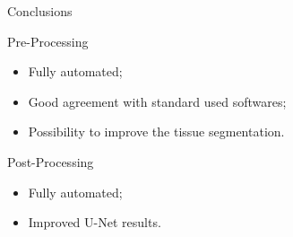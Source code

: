 \documentclass[]{standalone}
\begin{document}
	\begin{frame}{Conclusions}{}
	
	\begin{block}{Pre-Processing}
	\begin{itemize}
		\item Fully automated;
		\item Good agreement with standard used softwares;
		\item Possibility to improve the tissue segmentation.
	\end{itemize}
	\end{block}
	
	\begin{exampleblock}{Post-Processing}
	\begin{itemize}
		\item Fully automated;
		\item Improved U-Net results.
	\end{itemize}
	\end{exampleblock}
	
	
	\end{frame}
\end{document}
